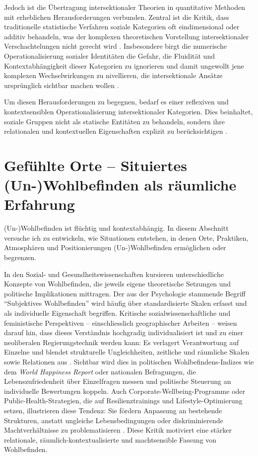 Jedoch ist die Übertragung intersektionaler Theorien in quantitative Methoden mit erheblichen Herausforderungen verbunden. Zentral ist die Kritik, dass traditionelle statistische Verfahren soziale Kategorien oft eindimensional oder additiv behandeln, was der komplexen theoretischen Vorstellung intersektionaler Verschachtelungen nicht gerecht wird \parencite{hancockWhenMultiplicationDoesnt2007, bowlegInvitedReflectionQuantifying2016}. Insbesondere birgt die numerische Operationalisierung sozialer Identitäten die Gefahr, die Fluidität und Kontextabhängigkeit dieser Kategorien zu ignorieren und damit ungewollt jene komplexen Wechselwirkungen zu nivellieren, die intersektionale Ansätze ursprünglich sichtbar machen wollen \parencite{scottIntersectionalityQuantitativeMethods2017}.

Um diesen Herausforderungen zu begegnen, bedarf es einer reflexiven und kontextsensiblen Operationalisierung intersektionaler Kategorien. Dies beinhaltet, soziale Gruppen nicht als statische Entitäten zu behandeln, sondern ihre relationalen und kontextuellen Eigenschaften explizit zu berücksichtigen \parencite{rodo-de-zarateDevelopingGeographiesIntersectionality2014, websterCenteringSocialtechnicalRelations2021}.


\section{Gefühlte Orte -- Situiertes (Un-)Wohlbefinden als räumliche Erfahrung}

(Un\nobreakdash-)Wohlbefinden ist flüchtig und kontextabhängig. In diesem Abschnitt versuche ich zu entwickeln, wie Situationen entstehen, in denen Orte, Praktiken, Atmosphären und Positionierungen (Un\nobreakdash-)Wohlbefinden ermöglichen oder begrenzen.

In den Sozial- und Gesundheitswissenschaften kursieren unterschiedliche Konzepte von Wohlbefinden, die jeweils eigene theoretische Setzungen und politische Implikationen mittragen. Der aus der Psychologie stammende Begriff \enquote{Subjektives Wohlbefinden} wird häufig über standardisierte Skalen erfasst und als individuelle Eigenschaft begriffen. Kritische sozialwissenschaftliche und feministische Perspektiven -- einschliesslich geographischer Arbeiten -- weisen darauf hin, dass dieses Verständnis hochgradig individualisiert ist und zu einer neoliberalen Regierungstechnik werden kann: Es verlagert Verantwortung auf Einzelne und blendet strukturelle Ungleichheiten, zeitliche und räumliche Skalen sowie Relationen aus \parencite{atkinsonToxicEffectsSubjective2021}. Sichtbar wird dies in politischen Wohlbefindens-Indizes wie dem \emph{World Happiness Report} oder nationalen Befragungen, die Lebenszufriedenheit über Einzelfragen messen und politische Steuerung an individuelle Bewertungen koppeln. Auch Corporate-Wellbeing-Programme oder Public-Health-Strategien, die auf Resilienztrainings und Lifestyle-Optimierung setzen, illustrieren diese Tendenz: Sie fördern Anpassung an bestehende Strukturen, anstatt ungleiche Lebensbedingungen oder diskriminierende Machtverhältnisse zu problematisieren \parencite[\gls{vgl}]{atkinsonToxicEffectsSubjective2021}. Diese Kritik motiviert eine stärker relationale, räumlich-kontextualisierte und machtsensible Fassung von Wohlbefinden.

